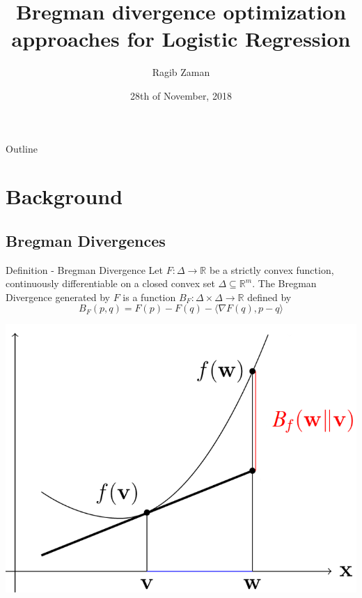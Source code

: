 \documentclass[10pt]{beamer}
\title{Bregman divergence optimization approaches for Logistic Regression}
\author{Ragib Zaman}
\date{28th of November, 2018}
\begin{document}
\begin{frame}
  \titlepage
\end{frame}

\begin{frame}{Outline}
  \tableofcontents
\end{frame}

\section{Background}

\subsection{Bregman Divergences}

\begin{frame}{Definition - Bregman Divergence}
Let $F: \Delta \to \mathbb{R}$ be a strictly convex function, continuously differentiable on a closed convex set $\Delta\subseteq \mathbb{R}^m.$ The Bregman Divergence generated by $F$ is a function $B_F : \Delta \times \Delta \to \mathbb{R}$ defined by $$ B_F(p,q) = F(p) - F(q) - \langle \nabla F(q), p-q \rangle$$ 

\begin{center}
 \includegraphics[scale=0.3,keepaspectratio=true]{./entropy-16-06338f2-1024.png}
\end{center}
\end{frame}
\end{document}
